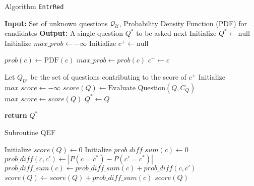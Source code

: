 \begin{algorithm}
\caption{Algorithm {\tt EntrRed}}\label{alg:entred}
\begin{algorithmic}[1]
    \State \textbf{Input:} Set of unknown questions $\mathcal{Q_U}$, Probability Density Function (PDF) for candidates
    \State \textbf{Output:} A single question $Q^*$ to be asked next
    \State Initialize $Q^* \gets \text{null}$
    \State Initialize $max\_prob \gets -\infty$
    \State Initialize $c^+ \gets \text{null}$  
    
        \State $prob(c) \gets \text{PDF}(c)$ 
            \State $max\_prob \gets prob(c)$
            \State $c^+ \gets c$  
        \EndIf
    \EndFor

    \State Let $Q_{U'}$ be the set of questions contributing to the score of $c^+$
    \State Initialize $max\_score \gets -\infty$
        \State $score(Q) \gets \text{Evaluate\_Question}(Q, C_Q)$ 
            \State $max\_score \gets score(Q)$
            \State $Q^* \gets Q$  
        \EndIf
    \EndFor
    
    \State \textbf{return} $Q^*$
\end{algorithmic}
\end{algorithm}

\begin{algorithm}
\caption{Subroutine QEF}\label{alg:qef}
\begin{algorithmic}[1]
        \State Initialize $score(Q) \gets 0$
            \State Initialize $prob\_diff\_sum(c) \gets 0$
                \State $prob\_diff(c,c') \gets \left| P(c = c^*) - P(c' = c^*) \right|$
                \State $prob\_diff\_sum(c) \gets prob\_diff\_sum(c) + prob\_diff(c,c')$
            \EndFor
            \State $score(Q) \gets score(Q) + prob\_diff\_sum(c)$
        \EndFor
        \State \Return $score(Q)$
    \EndFunction
\end{algorithmic}
\end{algorithm}



 

   


